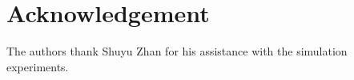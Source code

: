 \documentclass[letterpaper, 10 pt, conference]{ieeeconf}
\newcommand{\?}{\stackrel{?}{=}}
\newcommand{\frank}[1]{{\textcolor[rgb]{0,0,1}{\textsf{[Frank: {#1}]}}}}
\newcommand{\antoine}[1]{{\textcolor[rgb]{1,0,0}{\textsf{[Antoine: {#1}]}}}}
\newcommand{\INCOMPLETE}{\textcolor[rgb]{1,0,0}{\textbf{INCOMPLETE}}}
\begin{document}





% 


% 




\section*{Acknowledgement}
The authors thank Shuyu Zhan for his assistance with the simulation experiments.
















\end{document}
